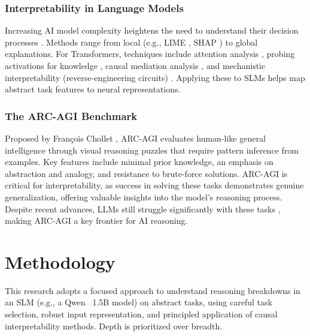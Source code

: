 \documentclass[12pt,a4paper]{article}
\begin{document}
\subsubsection*{Interpretability in Language Models}
Increasing AI model complexity heightens the need to understand their decision processes \parencite{amodei2025urgency}. Methods range from local (e.g., LIME \parencite{ribeiro2016whyitrustyou}, SHAP \parencite{lundberg2017unified}) to global explanations. For Transformers, techniques include attention analysis \parencite{bahdanau2014neural, vig2019analyzing}, probing activations for knowledge \parencite{alain2016understanding, hewitt2019structural, fierro2025multilinguallanguagemodelsremember, wendler2024llamasworkenglishlatent}, causal mediation analysis \parencite{vig2020causal, geiger2021examining}, and mechanistic interpretability (reverse-engineering circuits) \parencite{olah2020zoom, elhage2021mathematical, nanda2023progress, olsson2022context, kantamneni2025languagemodelsusetrigonometry}. Applying these to SLMs helps map abstract task features to neural representations.


\subsubsection*{The ARC-AGI Benchmark}  
Proposed by François Chollet \parencite{chollet2019measure}, ARC-AGI \parencite{arc2024} evaluates human-like general intelligence through visual reasoning puzzles that require pattern inference from examples. Key features include minimal prior knowledge, an emphasis on abstraction and analogy, and resistance to brute-force solutions. ARC-AGI is critical for interpretability, as success in solving these tasks demonstrates genuine generalization, offering valuable insights into the model's reasoning process. Despite recent advances, LLMs still struggle significantly with these tasks \parencite{xu2023comprehensive, ichter2023can}, making ARC-AGI a key frontier for AI reasoning.


\section*{Methodology}

This research adopts a focused approach to understand reasoning breakdowns in an SLM (e.g., a Qwen ~1.5B model) on abstract tasks, using careful task selection, robust input representation, and principled application of causal interpretability methods. Depth is prioritized over breadth.
\end{document}

